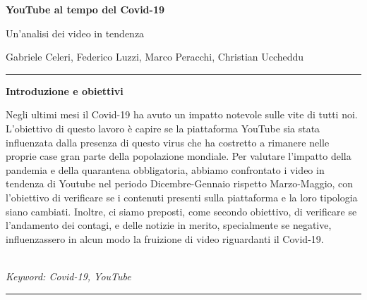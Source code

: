 \documentclass[10pt, a4paper,openany]{article}
\begin{document}
\begin{center}
\huge\textbf{YouTube al tempo del Covid-19}

Un'analisi dei video in tendenza
\end{center}

\begin{center}
Gabriele Celeri, Federico Luzzi,  Marco Peracchi, Christian Uccheddu
\end{center}

\hrule
\vspace{0.2cm}
\begin{center}\textbf{Introduzione e obiettivi}\end{center} 
Negli ultimi mesi il Covid-19 ha avuto un impatto notevole sulle vite di tutti noi. L'obiettivo di questo lavoro è capire se la piattaforma YouTube sia stata influenzata dalla presenza di questo virus che ha costretto a rimanere nelle proprie case gran parte della popolazione mondiale. 
Per valutare l'impatto della pandemia e della quarantena obbligatoria, abbiamo confrontato i video in tendenza di Youtube nel periodo Dicembre-Gennaio rispetto Marzo-Maggio, con l'obiettivo di verificare se i contenuti presenti sulla piattaforma e la loro tipologia siano cambiati.
Inoltre, ci siamo preposti, come secondo obiettivo, di verificare se l'andamento dei contagi, e delle notizie in merito, specialmente se negative, influenzassero in alcun modo la fruizione di video riguardanti il Covid-19.
\\\\ \begin{small}
	\textit{Keyword: Covid-19, YouTube}
\end{small}
\vspace{0.2cm}
\hrule



  
\end{document}
